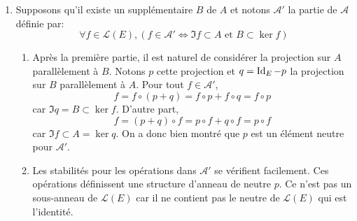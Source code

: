 \begin{enumerate}
\item Supposons qu'il existe un supplémentaire  $B$ de $A$ et notons $\mathcal{A}'$ la partie de $\mathcal{A}$ définie par:
\begin{displaymath}
 \forall f\in\mathcal{L}(E),\left(  f\in \mathcal{A}' \Leftrightarrow \Im f \subset A \text{ et } B\subset \ker f\right) 
\end{displaymath}
\begin{enumerate}
 \item Après la première partie, il est naturel de considérer la projection sur $A$ parallèlement à $B$. Notons $p$ cette projection et $q=\operatorname{Id}_E-p$ la projection sur $B$ parallèlement à $A$.\newline
Pour tout $f\in\mathcal{A}'$,
\begin{displaymath}
 f=f\circ(p+q)=f\circ p + f\circ q =f\circ p 
\end{displaymath}
car $\Im q = B \subset \ker f$. D'autre part,
\begin{displaymath}
 f = (p+q)\circ f = p\circ f + q\circ f = p\circ f
\end{displaymath}
car $\Im f\subset A = \ker q$. On a donc bien montré que $p$ est un élément neutre pour $\mathcal{A}'$.

 \item Les stabilités pour les opérations dans $\mathcal{A}'$ se vérifient facilement. Ces opérations définissent une structure d'anneau de neutre $p$. Ce n'est pas un sous-anneau de $\mathcal{L}(E)$ car il ne contient pas le neutre de $\mathcal{L}(E)$ qui est l'identité. 
\end{enumerate}
\end{enumerate}
